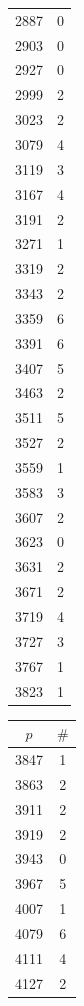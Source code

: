 \documentclass{article}
\theoremstyle{definition}
\begin{document}
\begin{table}[htbp]
\begin{minipage}{0.135\textwidth}
\begin{tabular}{c|c}
        2887 & 0 \\
        2903 & 0 \\
        2927 & 0 \\
        2999 & 2 \\
        3023 & 2 \\
        3079 & 4 \\
        3119 & 3 \\
        3167 & 4 \\
        3191 & 2 \\
        3271 & 1 \\
        3319 & 2 \\
        3343 & 2 \\
        3359 & 6 \\
        3391 & 6 \\
        3407 & 5 \\
        3463 & 2 \\
        3511 & 5 \\
        3527 & 2 \\
        3559 & 1 \\
        3583 & 3 \\
        3607 & 2 \\
        3623 & 0 \\
        3631 & 2 \\
        3671 & 2 \\
        3719 & 4 \\
        3727 & 3 \\
        3767 & 1 \\
        3823 & 1
    \end{tabular}
\end{minipage}\hspace{-2mm}
%
\begin{minipage}{0.135\textwidth}
    \centering
    \begin{tabular}{c|c}
        $p$ & $\#$ \\ \hline
        3847 & 1 \\
        3863 & 2 \\
        3911 & 2 \\
        3919 & 2 \\
        3943 & 0 \\
        3967 & 5 \\
        4007 & 1 \\
        4079 & 6 \\
        4111 & 4 \\
        4127 & 2 \\

\end{tabular}
\end{minipage}
\end{table}
\end{document}
